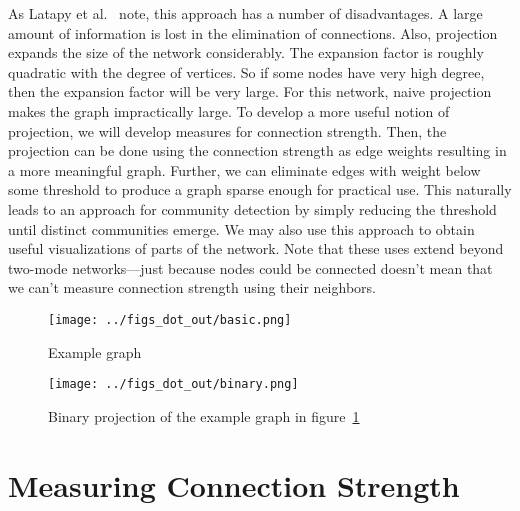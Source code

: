 \documentclass{pset}
\begin{document}
As Latapy et al.~\cite{latapy} note, this approach has a number of
disadvantages. A large amount of information is lost in the elimination of
connections. Also, projection expands the size of the network considerably. The
expansion factor is roughly quadratic with the degree of vertices. So if some
nodes have very high degree, then the expansion factor will
be very large.  For this network, naive projection makes the graph
impractically large. To develop a more useful notion of projection, we will
develop measures for connection strength.  Then, the projection can be done
using the connection strength as edge weights resulting in a more meaningful
graph. Further, we can eliminate edges with weight below some threshold to
produce a graph sparse enough for practical use. This naturally leads to an
approach for community detection by simply reducing the threshold until
distinct communities emerge. We may also use this approach to obtain useful
visualizations of parts of the network. Note that these uses extend beyond
two-mode networks---just because nodes could be connected doesn't mean that we
can't measure connection strength using their neighbors.

\begin{figure}[ht]
\centering
\texttt{[image: ../figs\_dot\_out/basic.png]}
\caption{Example graph}\label{fig:example}
\end{figure}

\begin{figure}[ht]
\centering
\texttt{[image: ../figs\_dot\_out/binary.png]}
\caption{Binary projection of the example graph in figure~\ref{fig:example}}\label{fig:binary}
\end{figure}

\section*{Measuring Connection Strength}
\end{document}

